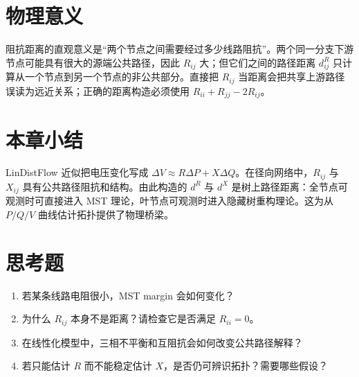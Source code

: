 \section{物理意义}

阻抗距离的直观意义是“两个节点之间需要经过多少线路阻抗”。两个同一分支下游节点可能具有很大的源端公共路径，因此 $R_{ij}$ 大；但它们之间的路径距离 $d^R_{ij}$ 只计算从一个节点到另一个节点的非公共部分。直接把 $R_{ij}$ 当距离会把共享上游路径误读为远近关系；正确的距离构造必须使用 $R_{ii}+R_{jj}-2R_{ij}$。

\section{本章小结}

LinDistFlow 近似把电压变化写成 $\Delta V\approx R\Delta P+X\Delta Q$。在径向网络中，$R_{ij}$ 与 $X_{ij}$ 具有公共路径阻抗和结构。由此构造的 $d^R$ 与 $d^X$ 是树上路径距离：全节点可观测时可直接进入 MST 理论，叶节点可观测时进入隐藏树重构理论。这为从 $P/Q/V$ 曲线估计拓扑提供了物理桥梁。

\section*{思考题}
\begin{enumerate}
  \item 若某条线路电阻很小，MST margin 会如何变化？
  \item 为什么 $R_{ij}$ 本身不是距离？请检查它是否满足 $R_{ii}=0$。
  \item 在线性化模型中，三相不平衡和互阻抗会如何改变公共路径解释？
  \item 若只能估计 $R$ 而不能稳定估计 $X$，是否仍可辨识拓扑？需要哪些假设？
\end{enumerate}
